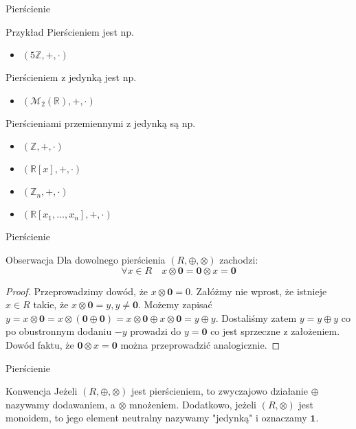 \documentclass{beamer}
\newcommand{\zero}{\mathbf{0}}
\newcommand{\one}{\mathbf{1}}
\begin{document}
\begin{frame}{Pierścienie}
    \begin{exampleblock}{Przykład}
        Pierścieniem jest np.
        \begin{itemize}
            \item $(5\mathbb{Z}, +, \cdot)$
        \end{itemize}
        Pierścieniem z jedynką jest np.
        \begin{itemize}
            \item $(\mathcal{M}_2(\mathbb{R}), +, \cdot)$
        \end{itemize}
        Pierścieniami przemiennymi z jedynką są np.
        \begin{itemize}
            \item $(\mathbb{Z}, +, \cdot )$
            \item $(\mathbb{R}[x], +, \cdot )$
            \item $(\mathbb{Z}_n, +, \cdot )$
            \item $(\mathbb{R}[x_1,\ldots, x_n], +, \cdot )$
        \end{itemize}
    \end{exampleblock}
\end{frame}

\begin{frame}{Pierścienie}
    \begin{block}{Obserwacja}
        Dla dowolnego pierścienia $(R, \oplus, \otimes)$ zachodzi:
        $$ \forall x \in R \quad x \otimes \zero =  \zero \otimes x = \zero$$
    \end{block}
    \pause 
    \begin{proof}
        Przeprowadzimy dowód, że $x \otimes \zero = 0$.
        Załóżmy nie wprost, że istnieje $x \in R$ takie, że $x \otimes \zero = y, y\neq \zero$.
        Możemy zapisać $y = x \otimes \zero = x \otimes (\zero \oplus \zero) = x \otimes \zero \oplus x \otimes \zero = y \oplus y$.
        Dostaliśmy zatem $y = y \oplus y$ co po obustronnym dodaniu $-y$ prowadzi do $y = \zero$ co jest sprzeczne z założeniem.
        Dowód faktu, że $\zero \otimes x = \zero$ można przeprowadzić analogicznie.
    \end{proof}
\end{frame}

\begin{frame}{Pierścienie}
    \begin{alertblock}{Konwencja}
        Jeżeli $(R, \oplus, \otimes)$ jest pierścieniem, to zwyczajowo działanie $\oplus$ nazywamy dodawaniem, a $\otimes$ mnożeniem.
        Dodatkowo, jeżeli $(R, \otimes)$ jest monoidem, to jego element neutralny nazywamy "jedynką" i oznaczamy $\one$. 
    \end{alertblock}
\end{frame}
\end{document}
